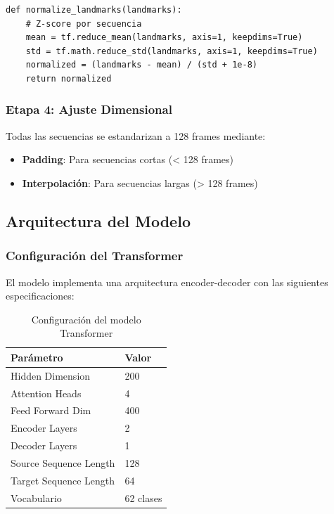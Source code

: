 \documentclass[12pt,a4paper]{article}
\begin{document}
\begin{lstlisting}[style=python, caption=Normalización por secuencia]
def normalize_landmarks(landmarks):
    # Z-score por secuencia
    mean = tf.reduce_mean(landmarks, axis=1, keepdims=True)
    std = tf.math.reduce_std(landmarks, axis=1, keepdims=True)
    normalized = (landmarks - mean) / (std + 1e-8)
    return normalized
\end{lstlisting}

\subsubsection{Etapa 4: Ajuste Dimensional}

Todas las secuencias se estandarizan a 128 frames mediante:
\begin{itemize}
    \item \textbf{Padding}: Para secuencias cortas (< 128 frames)
    \item \textbf{Interpolación}: Para secuencias largas (> 128 frames)
\end{itemize}

\subsection{Arquitectura del Modelo}

\subsubsection{Configuración del Transformer}

El modelo implementa una arquitectura encoder-decoder con las siguientes especificaciones:

\begin{table}[H]
\centering
\caption{Configuración del modelo Transformer}
\begin{tabular}{@{}ll@{}}
\toprule
\textbf{Parámetro} & \textbf{Valor} \\
\midrule
Hidden Dimension & 200 \\
Attention Heads & 4 \\
Feed Forward Dim & 400 \\
Encoder Layers & 2 \\
Decoder Layers & 1 \\
Source Sequence Length & 128 \\
Target Sequence Length & 64 \\
Vocabulario & 62 clases \\
\bottomrule
\end{tabular}
\end{table}
\end{document}

